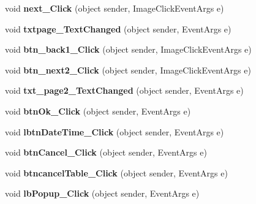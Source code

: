 \begin{DoxyCompactItemize}
\item 
\hypertarget{classusertrackothers__temperature_a5f7c7d948623c35adad758cf29e4ecf7}{void {\bfseries next\-\_\-\-Click} (object sender, Image\-Click\-Event\-Args e)}\label{classusertrackothers__temperature_a5f7c7d948623c35adad758cf29e4ecf7}

\item 
\hypertarget{classusertrackothers__temperature_a36e4bd6e212bcfac132412c020de60a2}{void {\bfseries txtpage\-\_\-\-Text\-Changed} (object sender, Event\-Args e)}\label{classusertrackothers__temperature_a36e4bd6e212bcfac132412c020de60a2}

\item 
\hypertarget{classusertrackothers__temperature_a45090072dabcf45af34af19fbd83a671}{void {\bfseries btn\-\_\-back1\-\_\-\-Click} (object sender, Image\-Click\-Event\-Args e)}\label{classusertrackothers__temperature_a45090072dabcf45af34af19fbd83a671}

\item 
\hypertarget{classusertrackothers__temperature_a6f7d7efdb5297dd2f38ff63334510abf}{void {\bfseries btn\-\_\-next2\-\_\-\-Click} (object sender, Image\-Click\-Event\-Args e)}\label{classusertrackothers__temperature_a6f7d7efdb5297dd2f38ff63334510abf}

\item 
\hypertarget{classusertrackothers__temperature_acd1fc934f96a60dd185829f4d12182eb}{void {\bfseries txt\-\_\-page2\-\_\-\-Text\-Changed} (object sender, Event\-Args e)}\label{classusertrackothers__temperature_acd1fc934f96a60dd185829f4d12182eb}

\item 
\hypertarget{classusertrackothers__temperature_aed9de0d99737a3c2503b0b7c45ae8b0b}{void {\bfseries btn\-Ok\-\_\-\-Click} (object sender, Event\-Args e)}\label{classusertrackothers__temperature_aed9de0d99737a3c2503b0b7c45ae8b0b}

\item 
\hypertarget{classusertrackothers__temperature_a3261904381bb232e2571f0a0774345b7}{void {\bfseries lbtn\-Date\-Time\-\_\-\-Click} (object sender, Event\-Args e)}\label{classusertrackothers__temperature_a3261904381bb232e2571f0a0774345b7}

\item 
\hypertarget{classusertrackothers__temperature_aee3b98a6c4628b2c387d7391b37fc962}{void {\bfseries btn\-Cancel\-\_\-\-Click} (object sender, Event\-Args e)}\label{classusertrackothers__temperature_aee3b98a6c4628b2c387d7391b37fc962}

\item 
\hypertarget{classusertrackothers__temperature_ae56e5d6c3cbbe7d3a2daba3517263446}{void {\bfseries btncancel\-Table\-\_\-\-Click} (object sender, Event\-Args e)}\label{classusertrackothers__temperature_ae56e5d6c3cbbe7d3a2daba3517263446}

\item 
\hypertarget{classusertrackothers__temperature_aad4d112a71c5b6776fa942c0c75928a1}{void {\bfseries lb\-Popup\-\_\-\-Click} (object sender, Event\-Args e)}\label{classusertrackothers__temperature_aad4d112a71c5b6776fa942c0c75928a1}

\end{DoxyCompactItemize}


